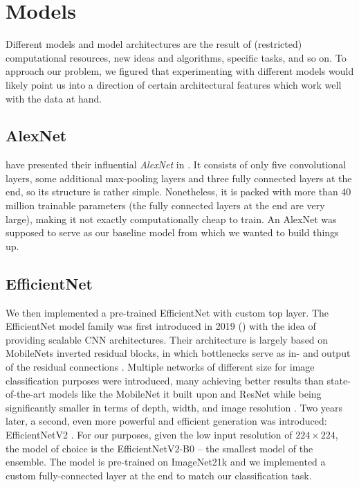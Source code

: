 \section{Models}
Different models and model architectures are the result of (restricted) computational resources, new ideas and algorithms, specific tasks, and so on. To approach our problem, we figured that experimenting with different models would likely point us into a direction of certain architectural features which work well with the data at hand.


\subsection{AlexNet}
\citeauthor{Krizhevsky2012} have presented their influential \emph{AlexNet} in \citeyear{Krizhevsky2012}. It consists of only five convolutional layers, some additional max-pooling layers and three fully connected layers at the end, so its structure is rather simple. Nonetheless, it is packed with more than 40 million trainable parameters (the fully connected layers at the end are very large), making it not exactly computationally cheap to train. An AlexNet was supposed to serve as our baseline model from which we wanted to build things up.


\subsection{EfficientNet}
We then implemented a pre-trained EfficientNet with custom top layer. The EfficientNet model family was first introduced in 2019 (\citeauthor{Tan2019}) with the idea of providing scalable CNN architectures. Their architecture is largely based on MobileNets inverted residual blocks, in which bottlenecks serve as in- and output of the residual connections \citep{Sandler2018}. Multiple networks of different size for image classification purposes were introduced, many achieving better results than state-of-the-art models like the MobileNet it built upon and ResNet while being significantly smaller in terms of depth, width, and image resolution \citep{Tan2019}. Two years later, a second, even more powerful and efficient generation was introduced: EfficientNetV2 \citep{Tan2021}. For our purposes, given the low input resolution of $224\times224$, the model of choice is the EfficientNetV2-B0 -- the smallest model of the ensemble. The model is pre-trained on ImageNet21k and we implemented a custom fully-connected layer at the end to match our classification task.


